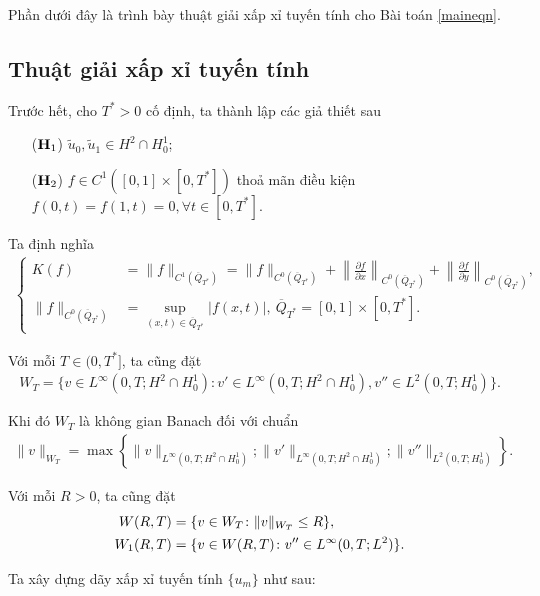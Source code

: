 \documentclass[12pt,a4paper]{article}
\theoremstyle{definition}
\theoremstyle{definition}
\begin{document}
Phần dưới đây là trình bày thuật giải xấp xỉ tuyến tính cho Bài toán \eqref{maineqn}.

\subsection{Thuật giải xấp xỉ tuyến tính}

Trước hết, cho $T^* > 0$ cố định, ta thành lập các giả thiết sau
\begin{enumerate}
    \item[(${\bf H}_1$)] $\tilde{u}_0, \tilde{u}_1 \in H^2 \cap H^1_0$;
    \item[(${\bf H}_2$)] $f \in C^1([0,1] \times [0,T^*])$ thoả mãn điều kiện $f(0,t) = f(1,t) = 0, \forall t \in [0, T^*]$.
\end{enumerate}

Ta định nghĩa
\begin{align*}
    \begin{cases}
        K(f) &= \|f\|_{C^1(\overline{Q}_{T^*})} = \|f\|_{C^0(\overline{Q}_{T^*})} + \left\|\frac{\partial f}{\partial x}\right\|_{C^0(\overline{Q}_{T^*})} + \left\|\frac{\partial f}{\partial y}\right\|_{C^0(\overline{Q}_{T^*})}, \\
        \|f\|_{C^0(\overline{Q}_{T^*})} &= \sup_{(x,t) \in \overline{Q}_{T^*}} |f(x,t)|,\  \overline{Q}_{T^*} = [0,1] \times [0,T^*].
    \end{cases}
\end{align*}

Với mỗi $T \in (0, T^*]$, ta cũng đặt
\begin{align*}
    W_T = \{ v \in L^\infty (0,T;H^2 \cap H^1_0) \colon v' \in L^\infty (0,T; H^2 \cap H^1_0), v'' \in L^2(0,T; H^1_0) \}.
\end{align*}

Khi đó $W_T$ là không gian Banach đối với chuẩn
\begin{align*}
    \|v\|_{W_T} = \max \left\{ \|v\|_{L^\infty(0,T;H^2 \cap H^1_0)} ; \|v'\|_{L^\infty(0,T;H^2 \cap H^1_0)}; \|v''\|_{ L^2(0,T;H^1_0)} \right\}.
\end{align*}

Với mỗi $R > 0$, ta cũng đặt
\begin{align} \label{wrtspace}
    W(R,T) &= \{ v \in W_T \colon \|v\|_{W_T} \le R \}, \\
    W_1(R,T) &= \{ v \in W(R,T) \colon v'' \in L^\infty(0,T;L^2) \}. \notag
\end{align}

Ta xây dựng dãy xấp xỉ tuyến tính $\{ u_m \}$ như sau:
\end{document}

